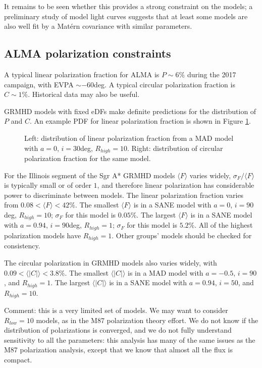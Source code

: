 \documentclass[twocolumn,tighten,dvipsnames]{aastex63}
\newcommand\<{{\langle}}
\renewcommand\>{{\rangle}} %
\begin{document}
It remains to be seen whether this provides a strong constraint on the models; a preliminary study of model light curves suggests that at least some models are also well fit by a Mat\'ern covariance with similar parameters.

\subsection{ALMA polarization constraints}

A typical linear polarization fraction for ALMA is $P \sim 6\%$ during the 2017 campaign, with EVPA $\sim -60$deg.  A typical circular polarization fraction is $C \sim 1\%$.  Historical data may also be useful.

GRMHD models with fixed eDFs make definite predictions for the distribution of $P$ and $C$.  An example PDF for linear polarization fraction is shown in Figure \ref{fig:lpexamp}.

\begin{figure}
    \centering
    \caption{Left: distribution of linear polarization fraction from a MAD model with $a = 0$, $i = 30$deg, $R_{high} = 10$. Right: distribution of circular polarization fraction for the same model.}
    \label{fig:lpexamp}
\end{figure}

For the Illinois segment of the Sgr A* GRMHD models $\< F\>$ varies widely, $\sigma_F/\<F\>$ is typically small or of order $1$, and therefore linear polarization has considerable power to discriminate between models.  The linear polarization fraction varies from $0.08 < \<F\> < 42 \%$.  The smallest $\<F\>$ is in a SANE model with $a = 0$, $i = 90$deg, $R_{high} = 10$; $\sigma_F$ for this model is $0.05\%$. The largest $\<F\>$ is in a SANE model with $a = 0.94$, $i = 90$deg, $R_{high} = 1$; $\sigma_F$ for this model is $5.2\%$.  All of the highest polarization models have $R_{high} = 1$.  Other groups' models should be checked for consistency.

The circular polarization in GRMHD models also varies widely, with  $0.09 < \<|C|\> < 3.8 \%$.  The smallest $\<|C|\>$ is in a MAD model with $a = -0.5$, $i = 90$, and $R_{high} = 1$.  The largest $\<|C|\>$ is in a SANE model with $a = 0.94$, $i = 50$, and $R_{high} = 10$.

Comment: this is a very limited set of models.  We may want to consider $R_{low} = 10$ models, as in the M87 polarization theory effort.   We do not know if the distribution of polarizations is converged, and we do not fully understand sensitivity to all the parameters: this analysis has many of the same issues as the M87 polarization analysis, except that we know that almost all the flux is compact.
\end{document}
